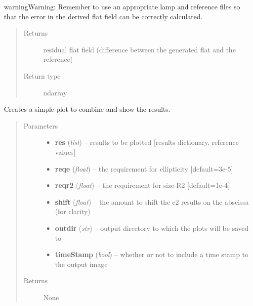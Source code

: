 \documentclass[a4paper,12pt,english]{sphinxmanual}
\begin{document}
\begin{fulllineitems}
\begin{notice}{warning}{Warning:}
Remember to use an appropriate lamp and reference files so that the error in the derived
flat field can be correctly calculated.
\end{notice}
\begin{quote}\begin{description}
\item[{Returns}] \leavevmode
residual flat field (difference between the generated flat and the reference)

\item[{Return type}] \leavevmode
ndarray

\end{description}\end{quote}

\end{fulllineitems}


\begin{fulllineitems}
\label{reduction:analysis.FlatfieldCalibration.plotNumberOfFrames}
Creates a simple plot to combine and show the results.
\begin{quote}\begin{description}
\item[{Parameters}] \leavevmode\begin{itemize}
\item {} 
\textbf{res} (\emph{list}) -- results to be plotted {[}results dictionary, reference values{]}

\item {} 
\textbf{reqe} (\emph{float}) -- the requirement for ellipticity {[}default=3e-5{]}

\item {} 
\textbf{reqr2} (\emph{float}) -- the requirement for size R2 {[}default=1e-4{]}

\item {} 
\textbf{shift} (\emph{float}) -- the amount to shift the e2 results on the abscissa (for clarity)

\item {} 
\textbf{outdir} (\emph{str}) -- output directory to which the plots will be saved to

\item {} 
\textbf{timeStamp} (\emph{bool}) -- whether or not to include a time stamp to the output image

\end{itemize}

\item[{Returns}] \leavevmode
None

\end{description}\end{quote}

\end{fulllineitems}
\end{document}
